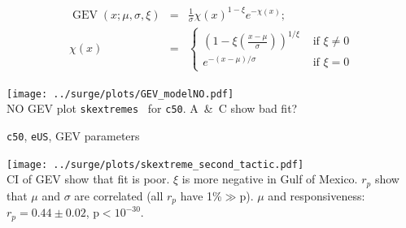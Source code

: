 \begin{frame}
\centering \vspace{-20pt}
\begin{align}
    \operatorname{GEV}(x; \mu, \sigma, \xi)&=&
    \frac{1}{\sigma} \chi(x)^{1-\xi} e^{-\chi(x)}; \tag{GEV-1} \label{eq:GEV-1} \\
    \chi(x)&=&\left\{\begin{array}{ll}
    \left(1-\xi\left(\frac{x-\mu}{\sigma}\right)\right)^{1 / \xi} & \text { if } \xi \neq 0 \\
    e^{-(x-\mu) / \sigma} & \text { if } \xi=0 \tag{GEV-2}
    \end{array}\right.
   \label{eq:GEV-2}
\end{align}

\texttt{[image: ../surge/plots/GEV\_modelNO.pdf]}\\
NO GEV plot \texttt{skextremes}~\cite{skextremes}
        for \texttt{c50}.
         A~\&~C show bad fit?

\end{frame}

\begin{frame}{\texttt{c50}, \texttt{eUS}, GEV parameters}
\vspace{-20pt}

\texttt{[image: ../surge/plots/skextreme\_second\_tactic.pdf]}\\
CI of GEV show that fit is poor.
$\xi$ is more negative
in Gulf of Mexico. $r_p$
show that $\mu$ and $\sigma$ are correlated (all $r_p$ have 1\%$\gg$p).
$\mu$ and responsiveness: $r_p=0.44\pm0.02$, p$<10^{-30}$.
\end{frame}

